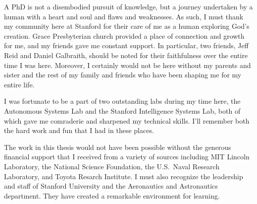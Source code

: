 \documentclass[12pt]{report}
\begin{document}
A PhD is not a disembodied pursuit of knowledge, but a journey undertaken by a human with a heart and soul and flaws and weaknesses.
As such, I must thank my community here at Stanford for their care of me as a human exploring God's creation.
Grace Presbyterian church provided a place of connection and growth for me, and my friends gave me constant support.
In particular, two friends, Jeff Reid and Daniel Galbraith, should be noted for their faithfulness over the entire time I was here.
Moreover, I certainly would not be here without my parents and sister and the rest of my family and friends who have been shaping me for my entire life.

I was fortunate to be a part of two outstanding labs during my time here, the Autonomous Systems Lab and the Stanford Intelligence Systems Lab, both of which gave me comraderie and sharpened my technical skills.
I'll remember both the hard work and fun that I had in these places.

The work in this thesis would not have been possible without the generous financial support that I received from a variety of sources including MIT Lincoln Laboratory, the National Science Foundation, the U.S.\ Naval Research Laboratory, and Toyota Resarch Institute.
I must also recognize the leadership and staff of Stanford University and the Aeronautics and Astronautics department.
They have created a remarkable environment for learning.

% 

\afterpreface











\appendix
% 

% 
% 


% 
% 
% 

\printbibliography
\end{document}
